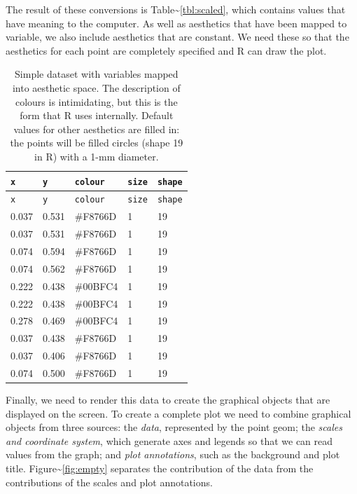 The result of these conversions is
Table\textasciitilde{}\ref{tbl:scaled}, which contains values that have
meaning to the computer. As well as aesthetics that have been mapped to
variable, we also include aesthetics that are constant. We need these so
that the aesthetics for each point are completely specified and R can
draw the plot.


\begin{longtable}[c]{@{}lllll@{}}
\caption{Simple dataset with variables mapped into aesthetic space. The
description of colours is intimidating, but this is the form that R uses
internally. Default values for other aesthetics are filled in: the
points will be filled circles (shape 19 in R) with a 1-mm
diameter.}\tabularnewline
\toprule
\texttt{x} & \texttt{y} & \texttt{colour} & \texttt{size} &
\texttt{shape}\tabularnewline
\midrule
\endfirsthead
\toprule
\texttt{x} & \texttt{y} & \texttt{colour} & \texttt{size} &
\texttt{shape}\tabularnewline
\midrule
\endhead
0.037 & 0.531 & \color{f8766d} \#F8766D & 1 & 19\tabularnewline
0.037 & 0.531 & \color{f8766d} \#F8766D & 1 & 19\tabularnewline
0.074 & 0.594 & \color{f8766d} \#F8766D & 1 & 19\tabularnewline
0.074 & 0.562 & \color{f8766d} \#F8766D & 1 & 19\tabularnewline
0.222 & 0.438 & \color{00bfc4} \#00BFC4 & 1 & 19\tabularnewline
0.222 & 0.438 & \color{00bfc4} \#00BFC4 & 1 & 19\tabularnewline
0.278 & 0.469 & \color{00bfc4} \#00BFC4 & 1 & 19\tabularnewline
0.037 & 0.438 & \color{f8766d} \#F8766D & 1 & 19\tabularnewline
0.037 & 0.406 & \color{f8766d} \#F8766D & 1 & 19\tabularnewline
0.074 & 0.500 & \color{f8766d} \#F8766D & 1 & 19\tabularnewline
\bottomrule
\end{longtable}

Finally, we need to render this data to create the graphical objects
that are displayed on the screen. To create a complete plot we need to
combine graphical objects from three sources: the \emph{data},
represented by the point geom; the \emph{scales and coordinate system},
which generate axes and legends so that we can read values from the
graph; and \emph{plot annotations}, such as the background and plot
title. Figure\textasciitilde{}\ref{fig:empty} separates the contribution
of the data from the contributions of the scales and plot annotations.

